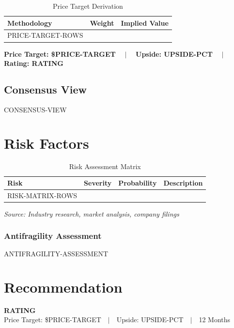 \documentclass[11pt,a4paper]{report}
\newcommand{\highlightbox}[2][gslightblue]{%
  \begin{center}
    \colorbox{#1}{\begin{minipage}{0.92\textwidth}\vspace{8pt}#2\vspace{8pt}\end{minipage}}
  \end{center}
}
\newcommand{\source}[1]{\hfill\small\textit{#1}}
\begin{document}
\begin{table}[H]
\centering
\caption{Price Target Derivation}
\begin{tabularx}{\textwidth}{lC{2.5cm}C{2.5cm}}
\toprule
\textbf{Methodology} & \textbf{Weight} & \textbf{Implied Value} \\
\midrule
PRICE-TARGET-ROWS
\bottomrule
\end{tabularx}
\end{table}

\highlightbox{%
\textbf{Price Target: \$PRICE-TARGET} ~~$\vert$~~ \textbf{Upside: UPSIDE-PCT} ~~$\vert$~~ \textbf{Rating: RATING}
}

\section{Consensus View}
CONSENSUS-VIEW

\chapter{Risk Factors}

\begin{table}[H]
\centering
\caption{Risk Assessment Matrix}
\begin{tabularx}{\textwidth}{lC{2cm}C{2.5cm}X}
\toprule
\textbf{Risk} & \textbf{Severity} & \textbf{Probability} & \textbf{Description} \\
\midrule
RISK-MATRIX-ROWS
\bottomrule
\end{tabularx}
\source{Source: Industry research, market analysis, company filings}
\end{table}

\subsection*{Antifragility Assessment}
ANTIFRAGILITY-ASSESSMENT

\chapter{Recommendation}

\begin{center}
  \vspace{10pt}
  {\Large\bfseries\color{gsblue} RATING}\\[6pt]
  {\large Price Target: \$PRICE-TARGET~~$\vert$~~Upside: UPSIDE-PCT~~$\vert$~~12 Months}
  \vspace{10pt}
\end{center}
\end{document}
